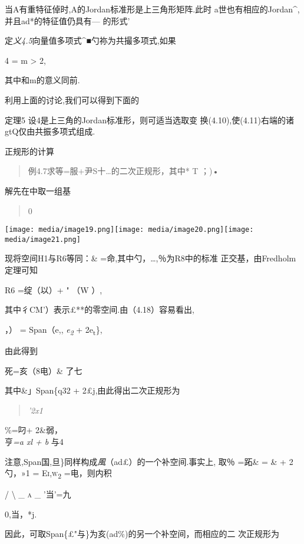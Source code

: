 \documentclass{article}
\begin{document}
当A有重特征倬时,A的Jordan标准形是上三角形矩阵.此时
a世也有相应的Jordan\^{},并且ad*的特征值仍具有--- 的形式'

定\emph{义4.5}向量值多项式\^{}■勺祢为共撮多项式,如果

4 = \textbar{}m\textbar{} \textgreater{} 2,

其中和\textbar{}m\textbar{}的意义同前.

利用上面的讨论,我们可以得到下面的

定理5 设4是上三角的Jordan标准形，则可适当选取变
换(4.10),使(4.11)右端的诸gtQ仅由共振多项式组成.\textbar{}

正规形的计算

\begin{quote}
例4.7求等=服+尹S十\ldots{}的二次正规形，其中* T ；)•
\end{quote}

解先在中取一组基

\begin{quote}
0
\end{quote}

\texttt{[image: media/image19.png]}\texttt{[image: media/image20.png]}\texttt{[image: media/image21.png]}

现将空间H1与R6等同：\& =命,其中勺，\ldots{},％为R8中的标准
正交基，由Fredholm定理可知

R6 =绽（以）+ " （W ）,

其中彳CM'）表示£**的零空间.由（4.18）容易看出,

，） = Span（e,, \emph{e\textsubscript{2}} + 2e\textsubscript{t}\},

由此得到

死=亥（8电）\& 了七

其中\&」Span\{q32 + 2£j,由此得出二次正规形为

\begin{quote}
\emph{'2x1}
\end{quote}

\%=叼+ 2\&弱，\\
亨\emph{=a xl + b} 与4

注意,Span国,旦\}同样构成\emph{風}（ad£）的一个补空间.事实上, 取％ =跖\&
= \& + 2勺，»1 = \textsc{Ei,w\textsubscript{2}} =电，则内积

\textsc{/ \textbackslash{} \_ a} \_ '当'=九

0,当，*j.

因此，可取Span\{£"与\}为亥(ad\%)的另一个补空间，而相应的二 次正规形为
\end{document}

